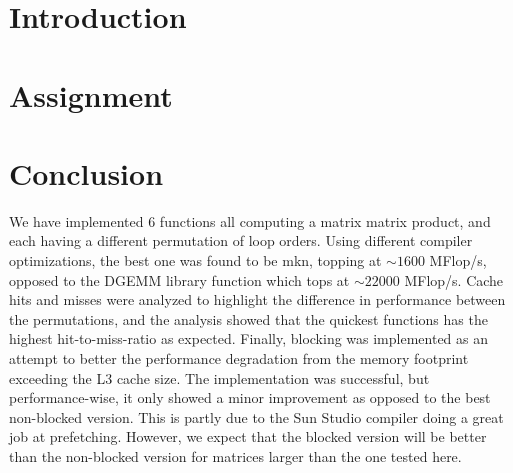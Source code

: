 


\newpage
\tableofcontents
\thispagestyle{empty}
\setcounter{page}{0}
\newpage
\section{Introduction}


\section{Assignment}




\section{Conclusion}
We have implemented 6 functions all computing a matrix matrix product, and each having a different permutation of loop orders. Using different compiler optimizations, the best one was found to be mkn, topping at $\sim 1600$ MFlop/s, opposed to the DGEMM library function which tops at $\sim 22000$ MFlop/s. Cache hits and misses were analyzed to highlight the difference in performance between the permutations, and the analysis showed that the quickest functions has the highest hit-to-miss-ratio as expected. Finally, blocking was implemented as an attempt to better the performance degradation from the memory footprint exceeding the L3 cache size. The implementation was successful, but performance-wise, it only showed a minor improvement as opposed to the best non-blocked version. This is partly due to the Sun Studio compiler doing a great job at prefetching. However, we expect that the blocked version will be better than the non-blocked version for matrices larger than the one tested here.

